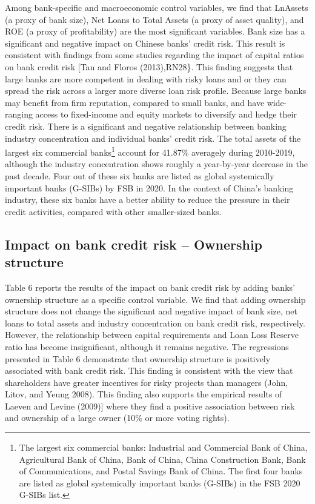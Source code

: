 \documentclass{article}
\begin{document}
Among bank-specific and macroeconomic control variables, we find that
LnAssets (a proxy of bank size), Net Loans to Total Assets (a proxy of
asset quality), and ROE (a proxy of profitability) are the most
significant variables. Bank size has a significant and negative impact
on Chinese banks' credit risk. This result is consistent with findings
from some studies regarding the impact of capital ratios on bank credit
risk {[}Tan and Floros (2013),RN28\}. This finding suggests that large
banks are more competent in dealing with risky loans and or they can
spread the risk across a larger more diverse loan risk profile. Because
large banks may benefit from firm reputation, compared to small banks,
and have wide-ranging access to fixed-income and equity markets to
diversify and hedge their credit risk. There is a significant and
negative relationship between banking industry concentration and
individual banks' credit risk. The total assets of the largest six
commercial banks\footnote{The largest six commercial banks: Industrial
  and Commercial Bank of China, Agricultural Bank of China, Bank of
  China, China Construction Bank, Bank of Communications, and Postal
  Savings Bank of China. The first four banks are listed as global
  systemically important banks (G-SIBs) in the FSB 2020 G-SIBs list.}
account for 41.87\% averagely during 2010-2019, although the industry
concentration shows roughly a year-by-year decrease in the past decade.
Four out of these six banks are listed as global systemically important
banks (G-SIBs) by FSB in 2020. In the context of China's banking
industry, these six banks have a better ability to reduce the pressure
in their credit activities, compared with other smaller-sized banks.

\hypertarget{impact-on-bank-credit-risk-ownership-structure}{%
\subsection{Impact on bank credit risk -- Ownership
structure}\label{impact-on-bank-credit-risk-ownership-structure}}

Table 6 reports the results of the impact on bank credit risk by adding
banks' ownership structure as a specific control variable. We find that
adding ownership structure does not change the significant and negative
impact of bank size, net loans to total assets and industry
concentration on bank credit risk, respectively. However, the
relationship between capital requirements and Loan Loss Reserve ratio
has become insignificant, although it remains negative. The regressions
presented in Table 6 demonstrate that ownership structure is positively
associated with bank credit risk. This finding is consistent with the
view that shareholders have greater incentives for risky projects than
managers (John, Litov, and Yeung 2008). This finding also supports the
empirical results of Laeven and Levine (2009){]} where they find a
positive association between risk and ownership of a large owner (10\%
or more voting rights).
\end{document}
